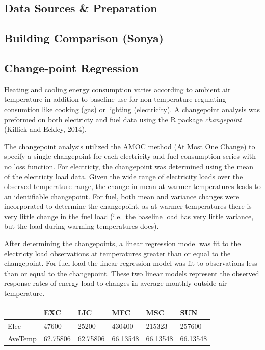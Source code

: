 \documentclass[]{article}
\begin{document}
\subsection{Data Sources \& Preparation}\label{data-sources-preparation}

\subsection{Building Comparison
(Sonya)}\label{building-comparison-sonya}

\subsection{Change-point Regression}\label{change-point-regression}

Heating and cooling energy consumption varies according to ambient air
temperature in addition to baseline use for non-temperature regulating
consumtion like cooking (gas) or lighting (electricity). A changepoint
analysis was preformed on both electricty and fuel data using the R
package \emph{changepoint} (Killick and Eckley, 2014).

The changepoint analysis utilized the AMOC method (At Most One Change)
to specify a single changepoint for each electricity and fuel
consumption series with no loss function. For electricty, the
changepoint was determined using the mean of the electricty load data.
Given the wide range of electricity loads over the observed temperature
range, the change in mean at warmer temperatures leads to an
identifiable changepoint. For fuel, both mean and variance changes were
incorporated to determine the changepoint, as at warmer temperatures
there is very little change in the fuel load (i.e.~the baseline load has
very little variance, but the load during warming temperatures does).

After determining the changepoints, a linear regression model was fit to
the electricty load observations at temperatures greater than or equal
to the changepoint. For fuel load the linear regression model was fit to
observations less than or equal to the changepoint. These two linear
models represent the observed response rates of energy load to changes
in average monthly outside air temperature.

\begin{longtable}[c]{@{}llllll@{}}
\toprule
& EXC & LIC & MFC & MSC & SUN\tabularnewline
\midrule
\endhead
Elec & 47600 & 25200 & 430400 & 215323 & 257600\tabularnewline
AveTemp & 62.75806 & 62.75806 & 66.13548 & 66.13548 &
66.13548\tabularnewline
\bottomrule
\end{longtable}
\end{document}
